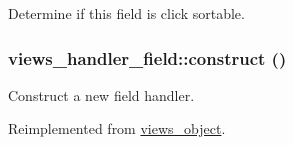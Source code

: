 Determine if this field is click sortable. \hypertarget{classviews__handler__field_3d50050864c255b71c842972a45d39f6}{
\subsubsection[{construct}]{\setlength{\rightskip}{0pt plus 5cm}views\_\-handler\_\-field::construct ()}}
\label{classviews__handler__field_3d50050864c255b71c842972a45d39f6}


Construct a new field handler. 

Reimplemented from \hyperlink{classviews__object_6583d6be7e59dd1e39056e320ea2c2d4}{views\_\-object}.

